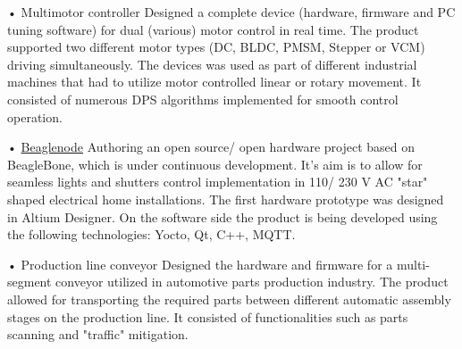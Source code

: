 \documentclass{tccv}
\begin{document}
\begin{yearlist}
\item[Full product bringup]{•}
     {Multimotor controller}
     {Designed a complete device (hardware, firmware and PC tuning software) for dual (various) motor control in real time. The product supported two different motor types (DC, BLDC, PMSM, Stepper  or VCM) driving simultaneously. The devices was used as part of different industrial machines that had to utilize motor controlled linear or rotary movement. It consisted of numerous DPS algorithms implemented for smooth control operation.}  
     
\item[Full product bringup]{•}
     {\href{https://github.com/bremenpl/BeagleNodeHW}{Beaglenode}}
     {Authoring an open source/ open hardware project based on BeagleBone, which is under continuous development. It's aim is to allow for seamless lights and shutters control implementation in 110/ 230 V AC "star" shaped electrical home installations. The first hardware prototype was designed in Altium Designer. On the software side the product is being developed using the following technologies: Yocto, Qt, C++, MQTT.} 

\item[Hardware and firmware development]{•}
     {Production line conveyor}
     {Designed the hardware and firmware for a multi-segment conveyor utilized in automotive parts production industry. The product allowed for transporting the required parts between different automatic assembly stages on the production line. It consisted of functionalities such as parts scanning and "traffic" mitigation.}  

\end{yearlist}
\end{document}
